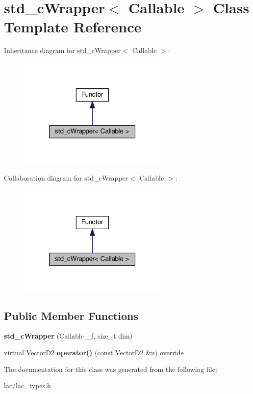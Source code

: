 \hypertarget{classstd__cWrapper}{}\section{std\+\_\+c\+Wrapper$<$ Callable $>$ Class Template Reference}
\label{classstd__cWrapper}


Inheritance diagram for std\+\_\+c\+Wrapper$<$ Callable $>$\+:\nopagebreak
\begin{figure}[H]
\begin{center}
\leavevmode
\includegraphics[width=211pt]{classstd__cWrapper__inherit__graph}
\end{center}
\end{figure}


Collaboration diagram for std\+\_\+c\+Wrapper$<$ Callable $>$\+:\nopagebreak
\begin{figure}[H]
\begin{center}
\leavevmode
\includegraphics[width=211pt]{classstd__cWrapper__coll__graph}
\end{center}
\end{figure}
\subsection*{Public Member Functions}
\begin{DoxyCompactItemize}
\item 
\mbox{\label{classstd__cWrapper_a09735ce0c98d33887d3909e6bfd68410}} 
{\bfseries std\+\_\+c\+Wrapper} (Callable \+\_\+f, size\+\_\+t dim)
\item 
\mbox{\label{classstd__cWrapper_aee56f148eb3f80a5b04efe130d9adb7d}} 
virtual Vector\+D2 {\bfseries operator()} (const Vector\+D2 \&u) override
\end{DoxyCompactItemize}


The documentation for this class was generated from the following file\+:\begin{DoxyCompactItemize}
\item 
lac/lac\+\_\+types.\+h\end{DoxyCompactItemize}
